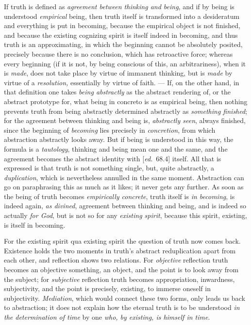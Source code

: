 \documentclass[12pt,a4paper,openany]{book}
\newcommand{\kpage}[1]{\marginnote{\footnotesize\textit{[#1]}}}
\newcommand{\ed}[1]{{\small[\textit{ed.}\ #1]}}
\begin{document}
If truth is defined as \emph{agreement between thinking
and being}, and if by being is understood \emph{empirical} being, then
truth itself is transformed into a desideratum and everything is put in becoming, because
the empirical object is not finished, and because the existing
cognizing spirit is itself indeed in becoming, and thus truth is an
approximating, in which the beginning cannot be absolutely posited, precisely
because there is no conclusion, which has retroactive force;
whereas every beginning (if it is not, by being conscious of this,
an arbitrariness), when it is \emph{made}, does not take place by virtue of
immanent thinking, but is \emph{made} by virtue of a \emph{resolution,} essentially
by virtue of faith. --- If, on the other hand, in that definition one takes \emph{being abstractly}
as the abstract rendering of, or the abstract prototype
for, what being in concreto is as empirical being, then nothing
prevents truth from being abstractly determined abstractly as \emph{something finished}\kpage{117};
for the agreement between thinking and being is, \emph{abstractly
seen}, always finished, since the beginning of \emph{becoming} lies precisely in \emph{concretion},
from which abstraction abstractly looks away. But if being is understood
in this way, the formula is a \emph{tautology}, thinking and being mean one
and the same, and the agreement becomes the abstract identity
with \ed{68.4} itself. All that is expressed is that truth is not
something single, but, quite abstractly, a \emph{duplication}, which is nevertheless annulled in the same
moment. Abstraction can go on paraphrasing this
as much as it likes; it never gets any further. As soon as the being of truth
becomes \emph{empirically concrete}, truth itself is \emph{in becoming}, is indeed again,
\emph{as divined}, agreement between thinking and being, and is
indeed so actually \emph{for God}, but is not so for any \emph{existing
spirit}, because this spirit, existing, is itself in becoming.

For the existing spirit qua existing spirit the question of truth
now comes back. Existence holds the two moments
in truth's abstract reduplication apart from each other, and
reflection shows two relations. For \emph{objective} reflection
truth becomes an objective something, an object, and the point is to look
away from the subject; for \emph{subjective} reflection truth becomes
appropriation, inwardness, subjectivity, and the point is precisely,
existing, to immerse oneself in subjectivity. \emph{Mediation}, which would
connect these two forms, only leads us back to abstraction; it
does not explain how the eternal truth is to be understood \emph{in the
determination of time} by one \emph{who, by existing, is himself in time}.
\end{document}
